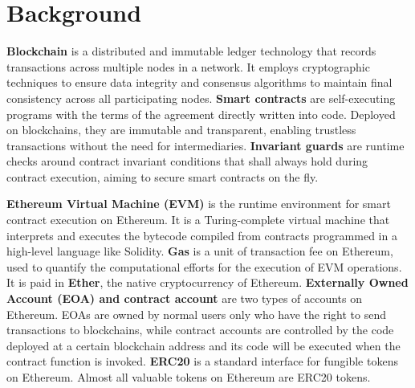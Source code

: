 \vspace{-1ex}
\section{Background}
\vspace{-0.5ex}



\noindent\textbf{Blockchain} is a distributed and immutable ledger technology that records transactions across multiple nodes in a network. It employs cryptographic techniques to ensure data integrity and consensus algorithms to maintain final consistency across all participating nodes. \noindent\textbf{Smart contracts} are self-executing programs with the terms of the agreement directly written into code. Deployed on blockchains, they are immutable and transparent, enabling trustless transactions without the need for intermediaries. \noindent \textbf{Invariant guards } are runtime checks around contract invariant conditions that shall always hold during contract execution, aiming to secure smart contracts on the fly.

\noindent\textbf{Ethereum Virtual Machine (EVM)}  is the runtime environment for smart contract execution on Ethereum. It is a Turing-complete virtual machine that interprets and executes the bytecode compiled from contracts programmed in a high-level language like Solidity. \noindent\textbf{Gas} is a unit of transaction fee on Ethereum, used to quantify the computational efforts for the execution of EVM operations. It is paid in \textbf{Ether}, the native cryptocurrency of Ethereum.
\noindent\textbf{Externally Owned Account (EOA) and contract account} are two types of accounts on Ethereum. EOAs are owned by normal users only who have the right to send transactions to blockchains, while contract accounts are controlled by the code deployed at a certain blockchain address and its code will be executed when the contract function is invoked. \noindent\textbf{ERC20} is a standard interface for fungible tokens on Ethereum. Almost all valuable tokens on Ethereum are ERC20 tokens.




